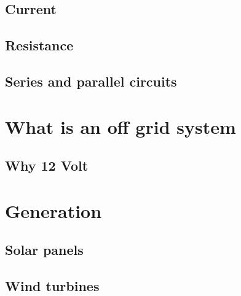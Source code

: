 \documentclass{article}
\theoremstyle{definition}
\theoremstyle{definition}
\theoremstyle{remark}
\begin{document}

  \subsection{Current} %
  \label{sub:current}
  

  \subsection{Resistance} %
  \label{sub:resistance}
  

  \subsection{Series and parallel circuits} %
  \label{sub:series_and_parallel_circuits}
  


\section{What is an off grid system} %
\label{sec:what_is_an_off_grid_system}

  \subsection{Why 12 Volt} %
  \label{sub:why_12_volt}
  


\section{Generation} %
\label{sec:generation}

  \subsection{Solar panels} %
  \label{sub:solar_panels}
  

  \subsection{Wind turbines} %
  \label{sub:wind_turbines}
  
\end{document}
